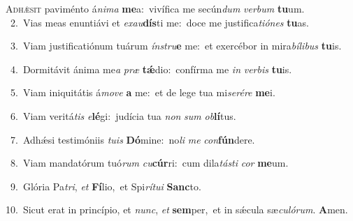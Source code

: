\lettrine{\initial\textcolor{\initialcolor}{A}}{dhǽsit} paviménto á\-\textit{ni}\-\textit{ma} \textbf{me}\-a:~\star vivífica me secún\textit{dum} \textit{ver}\-\textit{bum} \textbf{tu}\-um.\\
{\numbfont\textcolor{\numbcolor}{~2.}}~Vias meas enuntiávi et \textit{ex}\-\textit{au}\textbf{dís}ti me:~\star doce me justifica\-\textit{ti}\-\textit{ó}\textit{nes} \textbf{tu}\-as.\par
{\numbfont\textcolor{\numbcolor}{~3.}}~Viam justificatiónum tuárum \textit{ín}\-\textit{stru}\textbf{e} me:~\star et exercébor in mira\-\textit{bí}\-\textit{li}\textit{bus} \textbf{tu}\-is.\par
{\numbfont\textcolor{\numbcolor}{~4.}}~Dormitávit ánima me\textit{a} \textit{præ} \textbf{tǽ}\-dio:~\star confírma me \textit{in} \textit{ver}\-\textit{bis} \textbf{tu}\-is.\par
{\numbfont\textcolor{\numbcolor}{~5.}}~Viam iniquitátis á\-\textit{mo}\-\textit{ve} \textbf{a} me:~\star et de lege tua mi\-\textit{se}\-\textit{ré}\textit{re} \textbf{me}\-i.\par
{\numbfont\textcolor{\numbcolor}{~6.}}~Viam veritá\textit{tis} \textit{e}\-\textbf{lé}gi:~\star judícia tua \textit{non} \textit{sum} \textit{ob}\-\textbf{lí}tus.\par
{\numbfont\textcolor{\numbcolor}{~7.}}~Adhǽsi testimóniis \textit{tu}\-\textit{is} \textbf{Dó}\-mine:~\star no\textit{li} \textit{me} \textit{con}\-\textbf{fún}dere.\par
{\numbfont\textcolor{\numbcolor}{~8.}}~Viam mandatórum tuó\textit{rum} \textit{cu}\-\textbf{cúr}ri:~\star cum dila\-\textit{tás}\-\textit{ti} \textit{cor} \textbf{me}\-um.\par
{\numbfont\textcolor{\numbcolor}{~9.}}~Glória Pa\-\textit{tri}\-, \textit{et} \textbf{Fí}\-lio,~\star et Spi\-\textit{rí}\-\textit{tu}\textit{i} \textbf{Sanc}\-to.\par
{\numbfont\textcolor{\numbcolor}{10.}}~Sicut erat in princípio, et \textit{nunc}\-, \textit{et} \textbf{sem}\-per,~\star et in sǽcula sæ\-\textit{cu}\-\textit{ló}\textit{rum}. \textbf{A}\-men.\par
